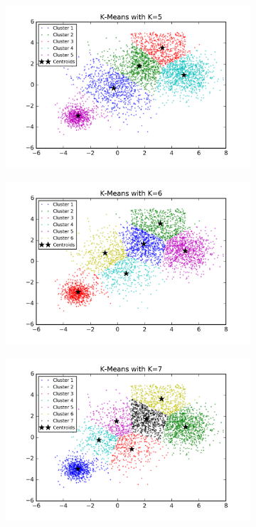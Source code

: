 \begin{description}
\begin{description}
\begin{figure}[!h]
\begin{subfigure}[b]{0.475\textwidth}
            \includegraphics[width=\textwidth]{./figures/bigClustering_kMeans_5.png}
        \end{subfigure}
        \hfill
        \begin{subfigure}[b]{0.475\textwidth}   
            \centering 
            \includegraphics[width=\textwidth]{./figures/bigClustering_kMeans_6.png}
        \end{subfigure}
        \begin{subfigure}[b]{0.475\textwidth}   
            \centering 
            \includegraphics[width=\textwidth]{./figures/bigClustering_kMeans_7.png}

\end{subfigure}
\end{figure}
\end{description}
\end{description}
